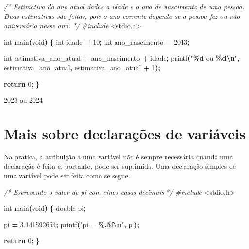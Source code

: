 \documentclass[
  11pt,
  a4paper,
]{scrbook}
\newenvironment{Shaded}{\begin{snugshade}}{\end{snugshade}}
\newcommand{\CommentTok}[1]{\textcolor[rgb]{0.56,0.35,0.01}{\textit{#1}}}
\newcommand{\ControlFlowTok}[1]{\textcolor[rgb]{0.13,0.29,0.53}{\textbf{#1}}}
\newcommand{\DataTypeTok}[1]{\textcolor[rgb]{0.13,0.29,0.53}{#1}}
\newcommand{\DecValTok}[1]{\textcolor[rgb]{0.00,0.00,0.81}{#1}}
\newcommand{\FloatTok}[1]{\textcolor[rgb]{0.00,0.00,0.81}{#1}}
\newcommand{\ImportTok}[1]{#1}
\newcommand{\NormalTok}[1]{#1}
\newcommand{\OperatorTok}[1]{\textcolor[rgb]{0.81,0.36,0.00}{\textbf{#1}}}
\newcommand{\PreprocessorTok}[1]{\textcolor[rgb]{0.56,0.35,0.01}{\textit{#1}}}
\newcommand{\SpecialCharTok}[1]{\textcolor[rgb]{0.81,0.36,0.00}{\textbf{#1}}}
\newcommand{\StringTok}[1]{\textcolor[rgb]{0.31,0.60,0.02}{#1}}
\begin{document}
\begin{Shaded}
\begin{Highlighting}[]
\CommentTok{/*}
\CommentTok{Estimativa do ano atual dadas a idade e o ano de nascimento de uma pessoa.}
\CommentTok{Duas estimativas são feitas, pois o ano corrente depende se a pessoa fez ou }
\CommentTok{não aniversário nesse ano.}
\CommentTok{*/}
\PreprocessorTok{\#include }\ImportTok{\textless{}stdio.h\textgreater{}}

\DataTypeTok{int}\NormalTok{ main}\OperatorTok{(}\DataTypeTok{void}\OperatorTok{)} \OperatorTok{\{}
    \DataTypeTok{int}\NormalTok{ idade }\OperatorTok{=} \DecValTok{10}\OperatorTok{;}
    \DataTypeTok{int}\NormalTok{ ano\_nascimento }\OperatorTok{=} \DecValTok{2013}\OperatorTok{;}

    \DataTypeTok{int}\NormalTok{ estimativa\_ano\_atual }\OperatorTok{=}\NormalTok{ ano\_nascimento }\OperatorTok{+}\NormalTok{ idade}\OperatorTok{;}
\NormalTok{    printf}\OperatorTok{(}\StringTok{"}\SpecialCharTok{\%d}\StringTok{ ou }\SpecialCharTok{\%d\textbackslash{}n}\StringTok{"}\OperatorTok{,}\NormalTok{ estimativa\_ano\_atual}\OperatorTok{,}\NormalTok{ estimativa\_ano\_atual }\OperatorTok{+} \DecValTok{1}\OperatorTok{);}

    \ControlFlowTok{return} \DecValTok{0}\OperatorTok{;}
\OperatorTok{\}}
\end{Highlighting}
\end{Shaded}

\begin{Shaded}
\begin{Highlighting}[]
\NormalTok{2023 ou 2024}
\end{Highlighting}
\end{Shaded}

\section{Mais sobre declarações de
variáveis}\label{sec-mais-sobre-declaracoes-de-variaveis}

Na prática, a atribuição a uma variável não é sempre necessária quando
uma declaração é feita e, portanto, pode ser suprimida. Uma declaração
simples de uma variável pode ser feita como se segue.

\begin{Shaded}
\begin{Highlighting}[]
\CommentTok{/*}
\CommentTok{Escrevendo o valor de pi com cinco casas decimais}
\CommentTok{*/}
\PreprocessorTok{\#include }\ImportTok{\textless{}stdio.h\textgreater{}}

\DataTypeTok{int}\NormalTok{ main}\OperatorTok{(}\DataTypeTok{void}\OperatorTok{)} \OperatorTok{\{}
    \DataTypeTok{double}\NormalTok{ pi}\OperatorTok{;}
    
\NormalTok{    pi }\OperatorTok{=} \FloatTok{3.141592654}\OperatorTok{;}
\NormalTok{    printf}\OperatorTok{(}\StringTok{"pi = }\SpecialCharTok{\%.5f\textbackslash{}n}\StringTok{"}\OperatorTok{,}\NormalTok{ pi}\OperatorTok{);}

    \ControlFlowTok{return} \DecValTok{0}\OperatorTok{;}
\OperatorTok{\}}
\end{Highlighting}
\end{Shaded}
\end{document}
